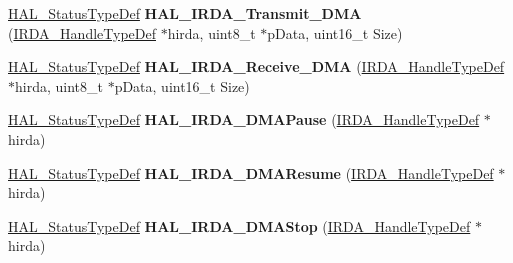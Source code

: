 \begin{DoxyCompactItemize}
\item 
\hyperlink{stm32f4xx__hal__def_8h_a63c0679d1cb8b8c684fbb0632743478f}{H\+A\+L\+\_\+\+Status\+Type\+Def} {\bfseries H\+A\+L\+\_\+\+I\+R\+D\+A\+\_\+\+Transmit\+\_\+\+D\+MA} (\hyperlink{struct_i_r_d_a___handle_type_def}{I\+R\+D\+A\+\_\+\+Handle\+Type\+Def} $\ast$hirda, uint8\+\_\+t $\ast$p\+Data, uint16\+\_\+t Size)\hypertarget{group___i_r_d_a___exported___functions___group2_ga18d0f0c044c27c41223b2f0361fe3ae3}{}\label{group___i_r_d_a___exported___functions___group2_ga18d0f0c044c27c41223b2f0361fe3ae3}

\item 
\hyperlink{stm32f4xx__hal__def_8h_a63c0679d1cb8b8c684fbb0632743478f}{H\+A\+L\+\_\+\+Status\+Type\+Def} {\bfseries H\+A\+L\+\_\+\+I\+R\+D\+A\+\_\+\+Receive\+\_\+\+D\+MA} (\hyperlink{struct_i_r_d_a___handle_type_def}{I\+R\+D\+A\+\_\+\+Handle\+Type\+Def} $\ast$hirda, uint8\+\_\+t $\ast$p\+Data, uint16\+\_\+t Size)\hypertarget{group___i_r_d_a___exported___functions___group2_gac62331245b03bde69283075bcfd8533c}{}\label{group___i_r_d_a___exported___functions___group2_gac62331245b03bde69283075bcfd8533c}

\item 
\hyperlink{stm32f4xx__hal__def_8h_a63c0679d1cb8b8c684fbb0632743478f}{H\+A\+L\+\_\+\+Status\+Type\+Def} {\bfseries H\+A\+L\+\_\+\+I\+R\+D\+A\+\_\+\+D\+M\+A\+Pause} (\hyperlink{struct_i_r_d_a___handle_type_def}{I\+R\+D\+A\+\_\+\+Handle\+Type\+Def} $\ast$hirda)\hypertarget{group___i_r_d_a___exported___functions___group2_ga4920b45618df428b579260ccb0783eb7}{}\label{group___i_r_d_a___exported___functions___group2_ga4920b45618df428b579260ccb0783eb7}

\item 
\hyperlink{stm32f4xx__hal__def_8h_a63c0679d1cb8b8c684fbb0632743478f}{H\+A\+L\+\_\+\+Status\+Type\+Def} {\bfseries H\+A\+L\+\_\+\+I\+R\+D\+A\+\_\+\+D\+M\+A\+Resume} (\hyperlink{struct_i_r_d_a___handle_type_def}{I\+R\+D\+A\+\_\+\+Handle\+Type\+Def} $\ast$hirda)\hypertarget{group___i_r_d_a___exported___functions___group2_gaf82acca0902e184d0805569889932795}{}\label{group___i_r_d_a___exported___functions___group2_gaf82acca0902e184d0805569889932795}

\item 
\hyperlink{stm32f4xx__hal__def_8h_a63c0679d1cb8b8c684fbb0632743478f}{H\+A\+L\+\_\+\+Status\+Type\+Def} {\bfseries H\+A\+L\+\_\+\+I\+R\+D\+A\+\_\+\+D\+M\+A\+Stop} (\hyperlink{struct_i_r_d_a___handle_type_def}{I\+R\+D\+A\+\_\+\+Handle\+Type\+Def} $\ast$hirda)\hypertarget{group___i_r_d_a___exported___functions___group2_ga3ffa3a8e6af6c73b96c482b306d20c6b}{}\label{group___i_r_d_a___exported___functions___group2_ga3ffa3a8e6af6c73b96c482b306d20c6b}


\end{DoxyCompactItemize}
